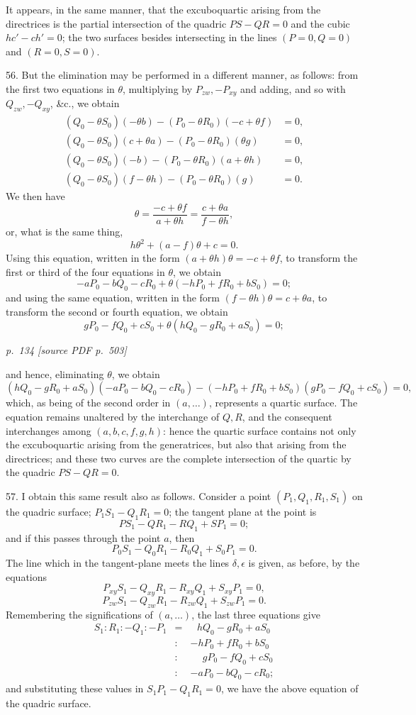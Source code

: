 \documentclass[11pt,a4paper]{article}
\newcommand{\sourcepage}[2]{%
  \bigskip
  \noindent\textit{p.~#1 [source PDF p.~#2]}%
  \par\smallskip
}
\begin{document}
It appears, in the same manner, that the excuboquartic arising from the directrices
is the partial intersection of the quadric $PS-QR=0$ and the cubic $hc'-ch'=0$;
the two surfaces besides intersecting in the lines $(P=0,Q=0)$ and $(R=0,S=0)$.

56. But the elimination may be performed in a different manner, as follows: from the
first two equations in $\theta$, multiplying by $P_{zw},-P_{xy}$ and adding, and so
with $Q_{zw},-Q_{xy}$, \&c., we obtain
\[
\begin{aligned}
(Q_0-\theta S_0)(-\theta b)-(P_0-\theta R_0)(-c+\theta f)&=0,\\
(Q_0-\theta S_0)(c+\theta a)-(P_0-\theta R_0)(\theta g)&=0,\\
(Q_0-\theta S_0)(-b)-(P_0-\theta R_0)(a+\theta h)&=0,\\
(Q_0-\theta S_0)(f-\theta h)-(P_0-\theta R_0)(g)&=0.
\end{aligned}
\]
We then have
\[
\theta=\frac{-c+\theta f}{a+\theta h}
=\frac{c+\theta a}{f-\theta h},
\]
or, what is the same thing,
\[
h\theta^2+(a-f)\theta+c=0.
\]
Using this equation, written in the form $(a+\theta h)\theta=-c+\theta f$, to
transform the first or third of the four equations in $\theta$, we obtain
\[
-aP_0-bQ_0-cR_0+\theta(-hP_0+fR_0+bS_0)=0;
\]
and using the same equation, written in the form $(f-\theta h)\theta=c+\theta a$,
to transform the second or fourth equation, we obtain
\[
gP_0-fQ_0+cS_0+\theta(hQ_0-gR_0+aS_0)=0;
\]

\sourcepage{134}{503}
and hence, eliminating $\theta$, we obtain
\[
(hQ_0-gR_0+aS_0)(-aP_0-bQ_0-cR_0)
-(-hP_0+fR_0+bS_0)(gP_0-fQ_0+cS_0)=0,
\]
which, as being of the second order in $(a,\ldots)$, represents a quartic surface.
The equation remains unaltered by the interchange of $Q,R$, and the consequent
interchanges among $(a,b,c,f,g,h)$: hence the quartic surface contains not only
the excuboquartic arising from the generatrices, but also that arising from the
directrices; and these two curves are the complete intersection of the quartic by
the quadric $PS-QR=0$.

57. I obtain this same result also as follows. Consider a point
$(P_1,Q_1,R_1,S_1)$ on the quadric surface; $P_1S_1-Q_1R_1=0$; the tangent plane
at the point is
\[
PS_1-QR_1-RQ_1+SP_1=0;
\]
and if this passes through the point $a$, then
\[
P_0S_1-Q_0R_1-R_0Q_1+S_0P_1=0.
\]
The line which in the tangent-plane meets the lines $\delta,\epsilon$ is given, as
before, by the equations
\[
P_{xy}S_1-Q_{xy}R_1-R_{xy}Q_1+S_{xy}P_1=0,
\]
\[
P_{zw}S_1-Q_{zw}R_1-R_{zw}Q_1+S_{zw}P_1=0.
\]
Remembering the significations of $(a,\ldots)$, the last three equations give
\[
\begin{array}{rcl}
S_1:R_1:-Q_1:-P_1
&=&\phantom{:}\ hQ_0-gR_0+aS_0\\
&:&-hP_0+fR_0+bS_0\\
&:&\phantom{-}gP_0-fQ_0+cS_0\\
&:&-aP_0-bQ_0-cR_0;
\end{array}
\]
and substituting these values in $S_1P_1-Q_1R_1=0$, we have the above equation
of the quadric surface.
\end{document}
